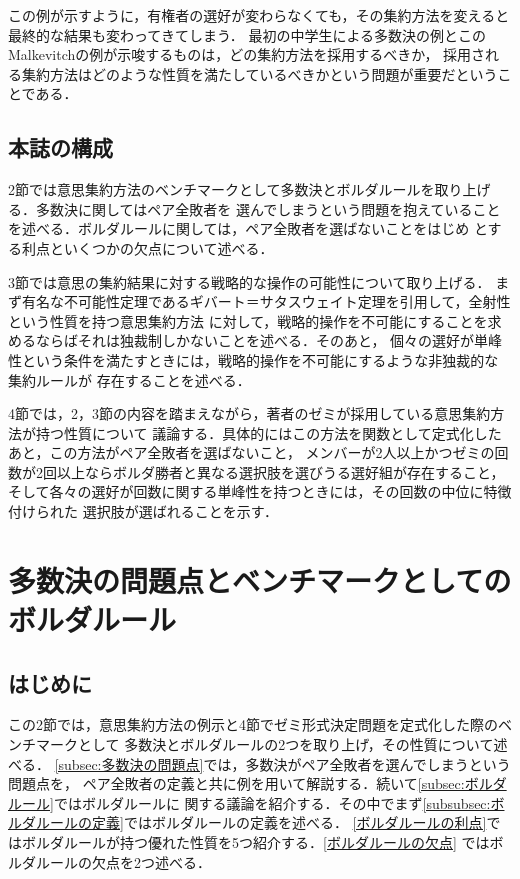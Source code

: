 \documentclass[dvipdfmx]{jsarticle}
\begin{document}
この例が示すように，有権者の選好が変わらなくても，その集約方法を変えると最終的な結果も変わってきてしまう．
最初の中学生による多数決の例とこのMalkevitchの例が示唆するものは，どの集約方法を採用するべきか，
採用される集約方法はどのような性質を満たしているべきかという問題が重要だということである．

\subsection{本誌の構成}
2節では意思集約方法のベンチマークとして多数決とボルダルールを取り上げる．多数決に関してはペア全敗者を
選んでしまうという問題を抱えていることを述べる．ボルダルールに関しては，ペア全敗者を選ばないことをはじめ
とする利点といくつかの欠点について述べる．

3節では意思の集約結果に対する戦略的な操作の可能性について取り上げる．
まず有名な不可能性定理であるギバート＝サタスウェイト定理を引用して，全射性という性質を持つ意思集約方法
に対して，戦略的操作を不可能にすることを求めるならばそれは独裁制しかないことを述べる．そのあと，
個々の選好が単峰性という条件を満たすときには，戦略的操作を不可能にするような非独裁的な集約ルールが
存在することを述べる．

4節では，2，3節の内容を踏まえながら，著者のゼミが採用している意思集約方法が持つ性質について
議論する．具体的にはこの方法を関数として定式化したあと，この方法がペア全敗者を選ばないこと，
メンバーが2人以上かつゼミの回数が2回以上ならボルダ勝者と異なる選択肢を選びうる選好組が存在すること，
そして各々の選好が回数に関する単峰性を持つときには，その回数の中位に特徴付けられた
選択肢が選ばれることを示す．

\section{多数決の問題点とベンチマークとしてのボルダルール}
\subsection{はじめに}
この2節では，意思集約方法の例示と4節でゼミ形式決定問題を定式化した際のベンチマークとして
多数決とボルダルールの2つを取り上げ，その性質について述べる．
\ref{subsec:多数決の問題点}では，多数決がペア全敗者を選んでしまうという問題点を，
ペア全敗者の定義と共に例を用いて解説する．続いて\ref{subsec:ボルダルール}ではボルダルールに
関する議論を紹介する．その中でまず\ref{subsubsec:ボルダルールの定義}ではボルダルールの定義を述べる．
\ref{ボルダルールの利点}ではボルダルールが持つ優れた性質を5つ紹介する．\ref{ボルダルールの欠点}
ではボルダルールの欠点を2つ述べる．
\end{document}
